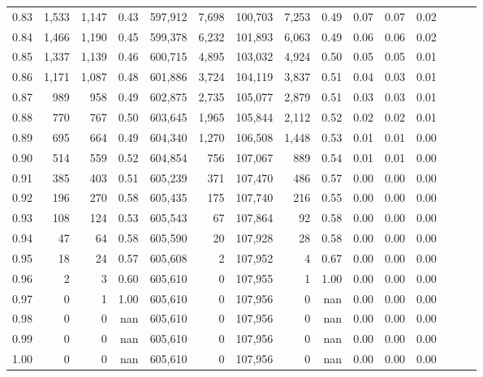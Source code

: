 \begin{tabular}{rrrrrrrrrrrrrrr}
0.83 &   1,533 &  1,147 &  0.43 &  597,912 &    7,698 &  100,703 &    7,253 &  0.49 &  0.07 &  0.07 &      0.02 \\
0.84 &   1,466 &  1,190 &  0.45 &  599,378 &    6,232 &  101,893 &    6,063 &  0.49 &  0.06 &  0.06 &      0.02 \\
0.85 &   1,337 &  1,139 &  0.46 &  600,715 &    4,895 &  103,032 &    4,924 &  0.50 &  0.05 &  0.05 &      0.01 \\
0.86 &   1,171 &  1,087 &  0.48 &  601,886 &    3,724 &  104,119 &    3,837 &  0.51 &  0.04 &  0.03 &      0.01 \\
0.87 &     989 &    958 &  0.49 &  602,875 &    2,735 &  105,077 &    2,879 &  0.51 &  0.03 &  0.03 &      0.01 \\
0.88 &     770 &    767 &  0.50 &  603,645 &    1,965 &  105,844 &    2,112 &  0.52 &  0.02 &  0.02 &      0.01 \\
0.89 &     695 &    664 &  0.49 &  604,340 &    1,270 &  106,508 &    1,448 &  0.53 &  0.01 &  0.01 &      0.00 \\
0.90 &     514 &    559 &  0.52 &  604,854 &      756 &  107,067 &      889 &  0.54 &  0.01 &  0.01 &      0.00 \\
0.91 &     385 &    403 &  0.51 &  605,239 &      371 &  107,470 &      486 &  0.57 &  0.00 &  0.00 &      0.00 \\
0.92 &     196 &    270 &  0.58 &  605,435 &      175 &  107,740 &      216 &  0.55 &  0.00 &  0.00 &      0.00 \\
0.93 &     108 &    124 &  0.53 &  605,543 &       67 &  107,864 &       92 &  0.58 &  0.00 &  0.00 &      0.00 \\
0.94 &      47 &     64 &  0.58 &  605,590 &       20 &  107,928 &       28 &  0.58 &  0.00 &  0.00 &      0.00 \\
0.95 &      18 &     24 &  0.57 &  605,608 &        2 &  107,952 &        4 &  0.67 &  0.00 &  0.00 &      0.00 \\
0.96 &       2 &      3 &  0.60 &  605,610 &        0 &  107,955 &        1 &  1.00 &  0.00 &  0.00 &      0.00 \\
0.97 &       0 &      1 &  1.00 &  605,610 &        0 &  107,956 &        0 &   nan &  0.00 &  0.00 &      0.00 \\
0.98 &       0 &      0 &   nan &  605,610 &        0 &  107,956 &        0 &   nan &  0.00 &  0.00 &      0.00 \\
0.99 &       0 &      0 &   nan &  605,610 &        0 &  107,956 &        0 &   nan &  0.00 &  0.00 &      0.00 \\
1.00 &       0 &      0 &   nan &  605,610 &        0 &  107,956 &        0 &   nan &  0.00 &  0.00 &      0.00 \\
\bottomrule
\end{tabular}
